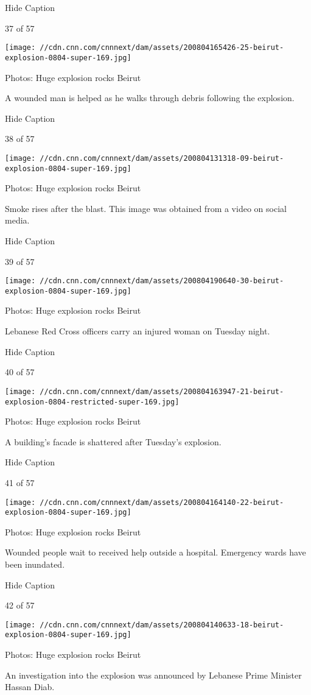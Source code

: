 Hide Caption

37 of 57

\texttt{[image: //cdn.cnn.com/cnnnext/dam/assets/200804165426-25-beirut-explosion-0804-super-169.jpg]}

Photos: Huge explosion rocks Beirut

A wounded man is helped as he walks through debris following the
explosion.

Hide Caption

38 of 57

\texttt{[image: //cdn.cnn.com/cnnnext/dam/assets/200804131318-09-beirut-explosion-0804-super-169.jpg]}

Photos: Huge explosion rocks Beirut

Smoke rises after the blast. This image was obtained from a video on
social media.

Hide Caption

39 of 57

\texttt{[image: //cdn.cnn.com/cnnnext/dam/assets/200804190640-30-beirut-explosion-0804-super-169.jpg]}

Photos: Huge explosion rocks Beirut

Lebanese Red Cross officers carry an injured woman on Tuesday night.

Hide Caption

40 of 57

\texttt{[image: //cdn.cnn.com/cnnnext/dam/assets/200804163947-21-beirut-explosion-0804-restricted-super-169.jpg]}

Photos: Huge explosion rocks Beirut

A building's facade is shattered after Tuesday's explosion.

Hide Caption

41 of 57

\texttt{[image: //cdn.cnn.com/cnnnext/dam/assets/200804164140-22-beirut-explosion-0804-super-169.jpg]}

Photos: Huge explosion rocks Beirut

Wounded people wait to received help outside a hospital. Emergency wards
have been inundated.

Hide Caption

42 of 57

\texttt{[image: //cdn.cnn.com/cnnnext/dam/assets/200804140633-18-beirut-explosion-0804-super-169.jpg]}

Photos: Huge explosion rocks Beirut

An investigation into the explosion was announced by Lebanese Prime
Minister Hassan Diab.


